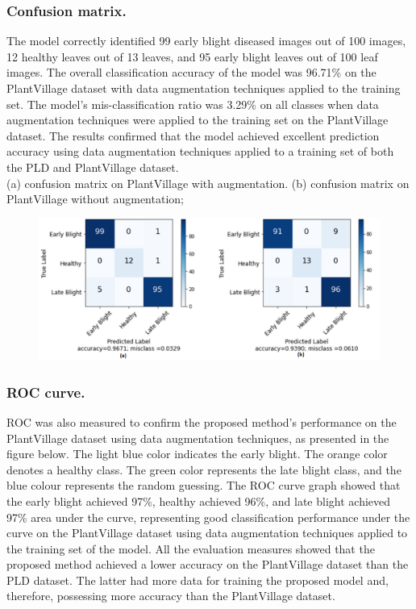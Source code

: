 \documentclass[11pt]{report}
\begin{document}
\newpage
\subsubsection*{Confusion matrix.}
The model correctly identified 99 early blight diseased images out of 100 images, 12 healthy leaves
out of 13 leaves, and 95 early blight leaves out of 100 leaf images. The overall classification
accuracy of the model was 96.71\% on the PlantVillage dataset with
data augmentation techniques applied to the training set. The model’s mis-classification ratio was 3.29\% on all classes when data augmentation techniques were applied to
the training set on the PlantVillage dataset. The results confirmed that the model achieved excellent prediction accuracy using data augmentation techniques
applied to a training set of both the PLD and PlantVillage dataset.\\

(a) confusion matrix on PlantVillage with augmentation. (b) confusion matrix on PlantVillage without augmentation;\\
\begin{figure}[h]
	\centerline{\small 
		\includegraphics[height=0.17\textheight]  {v4}}
\end{figure}


\subsubsection*{ROC curve.}
ROC was also measured to confirm the proposed method’s performance on the PlantVillage dataset using data augmentation techniques, as presented in the figure below.
The light blue color indicates the early blight. The orange color denotes a healthy
class. The green color represents the late blight class, and the blue colour represents
the random guessing. The ROC curve graph showed that the early blight achieved 97\%, healthy achieved 96\%, and late blight achieved 97\% area under the curve, representing
good classification performance under the curve on the PlantVillage dataset using data
augmentation techniques applied to the training set of the model. All
the evaluation measures showed that the proposed method achieved a lower accuracy on
the PlantVillage dataset than the PLD dataset. The latter had more data for training the
proposed model and, therefore, possessing more accuracy than the PlantVillage dataset.\\
\end{document}

